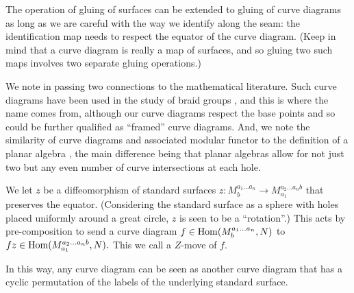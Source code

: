The operation of 
gluing of surfaces can be extended to gluing of curve diagrams as
long as we are careful with the way we identify along the seam:
the identification map needs to respect the equator of the curve diagram. 
(Keep in mind that a curve diagram is really a map of surfaces,
and so gluing two such maps involves two separate gluing operations.)


We note in passing two connections to the mathematical literature.
Such curve diagrams have been 
used in the study of braid groups \cite{Dehornoy2002}, and this
is where the name comes from, although our
curve diagrams respect the base points and so could be further
qualified as ``framed'' curve diagrams.
And, we note the similarity of curve diagrams and associated
modular functor 
to the definition of a planar algebra \cite{Jones1999},
the main difference being that planar algebras allow for 
not just two but any even number of curve intersections at each hole.


We let $z$ be a diffeomorphism of standard surfaces 
$z : M^{a_1...a_n}_{b} \to  M^{a_2...a_n{b}}_{{a_1}}$
that preserves the equator.
(Considering the standard surface as a sphere with holes
placed uniformly around a great circle, $z$ is seen to
be a ``rotation''.)
This acts by pre-composition to
send a curve diagram $f\in {\mathrm{Hom}}(M^{a_1...a_n}_{b}, N)$ to 
$fz \in {\mathrm{Hom}}(M^{a_2...a_n{b}}_{{a_1}}, N).$
This we call a $Z$-move of $f.$

In this way, any curve diagram can be seen as another
curve diagram that has a cyclic permutation of the labels of
the underlying standard surface.

